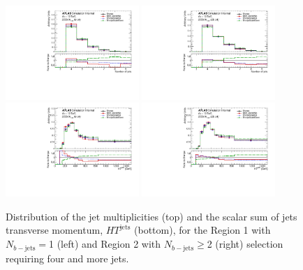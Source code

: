 \begin{figure}[!htb]
\centering
\includegraphics[width=0.45\textwidth]{Plots/ttV/shape/c_Region_0_nJets}
\includegraphics[width=0.45\textwidth]{Plots/ttV/shape/c_Region_1_nJets}\\
\includegraphics[width=0.45\textwidth]{Plots/ttV/shape/c_Region_0_HT_jets}
\includegraphics[width=0.45\textwidth]{Plots/ttV/shape/c_Region_1_HT_jets}\\
  \caption{Distribution of the jet multiplicities (top) and the scalar sum of jets transverse momentum, $HT^{\text{jets}}$ (bottom), for the Region 1 with $N_{b-\mathrm{jets}}=$1 (left) and Region 2 with  $N_{b-\mathrm{jets}}\geq$2 (right) selection requiring four and more jets.  \label{ttV:4j12b}}
\end{figure}


